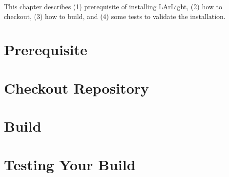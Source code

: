 
This chapter describes (1) prerequisite of installing LArLight, (2) how to checkout, (3) how to build, and (4) some tests to validate the installation.

\section{Prerequisite}
\label{sec:prerequisite}


\section{Checkout Repository}
\label{sec:checkout}


\section{Build}
\label{sec:build}


\section{Testing Your Build}
\label{sec:simpletest}



